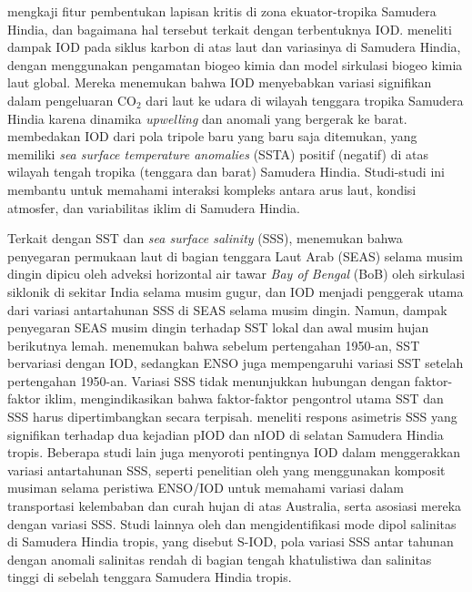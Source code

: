 \begin{spacing}{1.5}
	 mengkaji fitur pembentukan lapisan kritis di zona ekuator-tropika Samudera Hindia, dan bagaimana hal tersebut terkait dengan terbentuknya IOD.  meneliti dampak IOD pada siklus karbon di atas laut dan variasinya di Samudera Hindia, dengan menggunakan pengamatan biogeo kimia dan model sirkulasi biogeo kimia laut global. Mereka menemukan bahwa IOD menyebabkan variasi signifikan dalam pengeluaran CO$_2$ dari laut ke udara di wilayah tenggara tropika Samudera Hindia karena dinamika \textit{upwelling} dan anomali yang bergerak ke barat.  membedakan IOD dari pola tripole baru yang baru saja ditemukan, yang memiliki \textit{sea surface temperature anomalies} (SSTA) positif (negatif) di atas wilayah tengah tropika (tenggara dan barat) Samudera Hindia. Studi-studi ini membantu untuk memahami interaksi kompleks antara arus laut, kondisi atmosfer, dan variabilitas iklim di Samudera Hindia.
	
	Terkait dengan SST dan \textit{sea surface salinity} (SSS),  menemukan bahwa penyegaran permukaan laut di bagian tenggara Laut Arab (SEAS) selama musim dingin dipicu oleh adveksi horizontal air tawar \textit{Bay of Bengal} (BoB) oleh sirkulasi siklonik di sekitar India selama musim gugur, dan IOD menjadi penggerak utama dari variasi antartahunan SSS di SEAS selama musim dingin. Namun, dampak penyegaran SEAS musim dingin terhadap SST lokal dan awal musim hujan berikutnya lemah.  menemukan bahwa sebelum pertengahan 1950-an, SST bervariasi dengan IOD, sedangkan ENSO juga mempengaruhi variasi SST setelah pertengahan 1950-an. Variasi SSS tidak menunjukkan hubungan dengan faktor-faktor iklim, mengindikasikan bahwa faktor-faktor pengontrol utama SST dan SSS harus dipertimbangkan secara terpisah.  meneliti respons asimetris SSS yang signifikan terhadap dua kejadian pIOD dan nIOD di selatan Samudera Hindia tropis. Beberapa studi lain juga menyoroti pentingnya IOD dalam menggerakkan variasi antartahunan SSS, seperti penelitian oleh  yang menggunakan komposit musiman selama peristiwa ENSO/IOD untuk memahami variasi dalam transportasi kelembaban dan curah hujan di atas Australia, serta asosiasi mereka dengan variasi SSS. Studi lainnya oleh  dan  mengidentifikasi mode dipol salinitas di Samudera Hindia tropis, yang disebut S-IOD, pola variasi SSS antar tahunan dengan anomali salinitas rendah di bagian tengah khatulistiwa dan salinitas tinggi di sebelah tenggara Samudera Hindia tropis.
	

\end{spacing}
